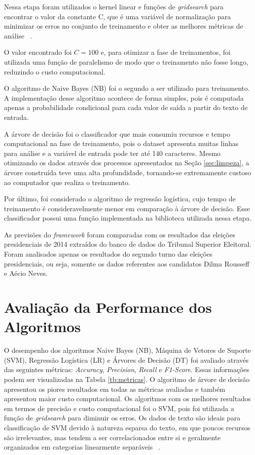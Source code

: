 Nessa etapa foram utilizados o kernel linear e funções de \textit{gridsearch} para encontrar o valor da constante C, 
que é uma variável de normalização para minimizar os erros no conjunto de treinamento e obter as melhores métricas de análise ~\cite{lorena2007introduccao}. 

O valor encontrado foi $C = 100$ e, para otimizar a fase de treinamentos, foi utilizada uma função de paralelismo de modo que o treinamento não fosse longo, reduzindo o custo computacional.

O algoritmo de Naive Bayes (NB) foi o segundo a ser utilizado para treinamento. A implementação desse algoritmo acontece de forma simples, pois é 
computada apenas a probabilidade condicional para cada valor de saída a partir do texto de entrada.


 A árvore de decisão foi o classificador que mais consumiu recursos e tempo computacional na fase de treinamento, pois o dataset apresenta muitas linhas para análise
 e a variável de entrada pode ter até 140 caracteres. Mesmo otimizando os dados através dos processos apresentados na Seção \ref{sec:limpeza}, 
 a árvore construída teve uma alta profundidade, tornando-se extremamente custoso ao computador que realiza o treinamento.
 
Por último, foi considerado o algoritmo de regressão logística, cujo tempo de treinamento é consideravelmente menor em comparação à árvore de decisão. Esse classificador possui uma função implementada na biblioteca utilizada nessa etapa.

As previsões do \textit{framework} foram comparadas com os 
resultados das eleições presidenciais de 2014 extraídos do banco
de dados do Tribunal Superior Eleitoral. Foram analisados apenas os resultados
do segundo turno das eleições presidenciais, ou seja, somente os dados referentes aos candidatos Dilma Rousseff e Aécio Neves.
 
 \section{Avaliação da Performance dos Algoritmos}
 
 O desempenho dos algoritmos Naive Bayes (NB), Máquina de
 Vetores de Suporte (SVM), Regressão Logística (LR) e Árvores de Decisão (DT)
 foi avaliado através das seguintes métricas: \textit{Accuracy}, \textit{Precision}, \textit{Recall} e \textit{F1-Score}. Essas informações podem ser visualizadas
 na Tabela \ref{tb:metricas}.
 O algoritmo de árvore de decisão apresentou os piores resultados em todas
 as métricas avaliadas e também apresentou maior custo
 computacional. Os algoritmos com os melhores resultados
 em termos de precisão e custo computacional foi o \acrshort{SVM}, pois foi utilizada a função de \textit{gridsearch} para
 diminuir os erros.
 Os dados de texto são ideais para classificação de SVM
 devido à natureza esparsa do texto, em que poucos recursos
 são irrelevantes, mas tendem a ser correlacionados entre si e
 geralmente organizados em categorias linearmente separáveis
 ~\cite{medhat}.
 
